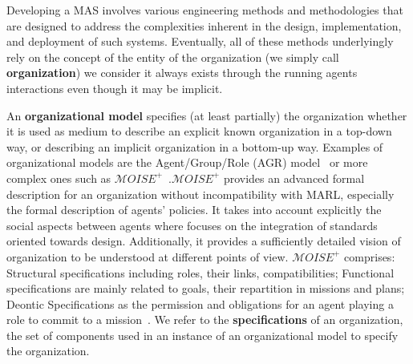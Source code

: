 \documentclass[runningheads]{llncs}
\begin{document}
Developing a MAS involves various engineering methods and methodologies that are designed to address the complexities inherent in the design, implementation, and deployment of such systems.
Eventually, all of these methods underlyingly rely on the concept of the entity of the organization (we simply call \textbf{organization}) we consider it always exists through the running agents interactions even though it may be implicit.


An \textbf{organizational model} specifies (at least partially) the organization whether it is used as medium to describe an explicit known organization in a top-down way, or describing an implicit organization in a bottom-up way. Examples of organizational models are the Agent/Group/Role (AGR) model~\cite{Ferber2004} or more complex ones such as $\mathcal{M}OISE^{+}$~\cite{Hubner2007}.$\mathcal{M}OISE^+$ provides an advanced formal description for an organization without incompatibility with MARL, especially the formal description of agents' policies. It takes into account explicitly the social aspects between agents where  focuses on the integration of standards oriented towards design. Additionally, it provides a sufficiently detailed vision of organization to be understood at different points of view. $\mathcal{M}OISE^+$ comprises: Structural specifications including roles, their links, compatibilities; Functional specifications are mainly related to goals, their repartition in missions and plans; Deontic Specifications as the permission and obligations for an agent playing a role to commit to a mission~\cite{Hubner2007}. We refer to the \textbf{specifications} of an organization, the set of components used in an instance of an organizational model to specify the organization.
\end{document}
